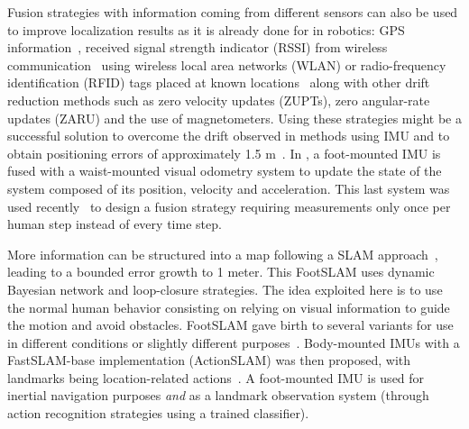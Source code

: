 Fusion strategies with information coming from different sensors can also be used to improve localization results as it is already done
for in robotics: GPS information~\cite{sukkarieh1999high,hide2012investigating,gao2014data}, received signal strength indicator (RSSI) from wireless communication~\cite{malyavej2013indoor} using wireless local area networks (WLAN) or radio-frequency identification (RFID) tags placed at known locations~\cite{ruiz2012accurate}
along with other drift reduction methods such as zero velocity updates (ZUPTs), zero angular-rate updates (ZARU) and the use of magnetometers.
Using these strategies might be a successful solution to overcome the drift observed in methods using IMU and to obtain positioning errors of approximately 1.5 m~\cite{ruiz2012accurate}.
In \cite{chdid2011inertial}, a foot-mounted IMU is fused with a waist-mounted visual odometry system to update the state of the system composed of its position, velocity and acceleration.
This last system was used recently~\cite{pierce2016incorporation} to design a fusion strategy requiring measurements only once per human step instead of every time step.

More information can be structured into a map following a SLAM approach~\cite{angermann2012footslam}, leading to a bounded error growth to 1 meter. This FootSLAM uses dynamic Bayesian network and loop-closure strategies.
The idea exploited here is to use the normal human behavior 
consisting on relying on visual information to guide the motion and avoid obstacles. FootSLAM gave birth to several variants for use in different conditions or slightly different purposes~\cite{puyol2012complexity,bruno2011wislam}.
Body-mounted IMUs with a FastSLAM-base implementation (ActionSLAM) was then proposed, with landmarks being location-related actions~\cite{hardegger2012actionslam}. 
A foot-mounted IMU is used for inertial navigation purposes \emph{and} as a landmark observation system (through action recognition strategies using a trained classifier).


